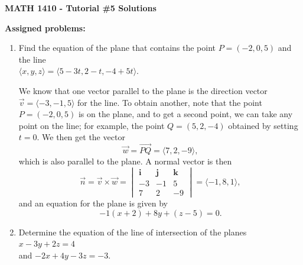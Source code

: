 \documentclass[12pt]{article}
\renewcommand{\i}{\mathbf{i}}
\renewcommand{\j}{\mathbf{j}}
\renewcommand{\k}{\mathbf{k}}
\newcommand{\bvm}{\begin{vmatrix}}
\newcommand{\evm}{\end{vmatrix}}
\begin{document}
\author{Instructor: Sean Fitzpatrick}
\thispagestyle{empty}
\begin{center}
{\bf MATH 1410 - Tutorial \#5 Solutions}
\end{center}





\textbf{Assigned problems:}
\begin{enumerate}

  
 \item Find the equation of the plane that contains the point $P=(-2,0,5)$ and the line\\ $\langle x,y,z\rangle = \langle 5-3t,2-t,-4+5t\rangle$.


\bigskip

We know that one vector parallel to the plane is the direction vector $\vec{v}=\langle -3,-1,5\rangle$ for the line. To obtain another, note that the point $P=(-2,0,5)$ is on the plane, and to get a second point, we can take any point on the line; for example, the point $Q=(5,2,-4)$ obtained by setting $t=0$. We then get the vector
\[
\vec{w}=\overrightarrow{PQ}=\langle 7,2,-9\rangle,
\]
which is also parallel to the plane. A normal vector is then
\[
\vec{n}=\vec{v}\times\vec{w} = \bvm \i&\j&\k\\-3&-1&5\\7&2&-9\evm = \langle -1, 8, 1\rangle,
\]
and an equation for the plane is given by
\[
-1(x+2)+8y+(z-5)=0.
\]

\item Determine the equation of the line of intersection of the planes $x-3y+2z=4$\\ and $-2x+4y-3z=-3$.


\end{enumerate}
\end{document}
